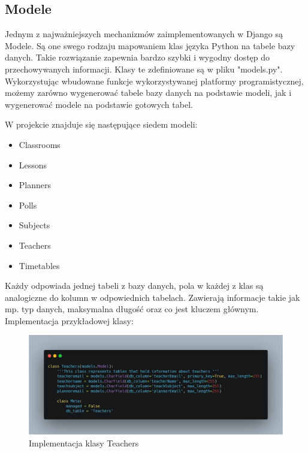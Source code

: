 \subsection{Modele}
Jednym z najważniejszych mechanizmów zaimplementowanych w Django są Modele. Są one swego rodzaju mapowaniem klas języka Python na tabele bazy danych. Takie rozwiązanie zapewnia bardzo szybki i wygodny dostęp do przechowywanych informacji. Klasy te zdefiniowane są w pliku "models.py". Wykorzystując wbudowane funkcje wykorzystywanej platformy programistycznej, możemy zarówno wygenerować tabele bazy danych na podstawie modeli, jak i wygenerować modele na podstawie gotowych tabel.

W projekcie znajduje się następujące siedem modeli: 
\begin{itemize}
	\item Classrooms
	\item Lessons
	\item Planners
	\item Polls
	\item Subjects
	\item Teachers
	\item Timetables
\end{itemize}
Każdy odpowiada jednej tabeli z bazy danych, pola w każdej z klas są analogiczne do kolumn w odpowiednich tabelach. Zawierają informacje takie jak mp. typ danych, maksymalna długość oraz co jest kluczem głównym.
Implementacja przykładowej klasy:
\begin{figure}[H]
	\centering\includegraphics[width=\textwidth]{figures/TeachersModel}
	\caption{Implementacja klasy Teachers}\label{rys:TeachersModel}
\end{figure}

